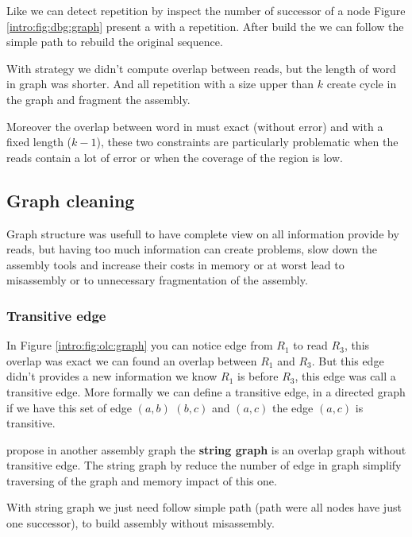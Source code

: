 \documentclass[./main.tex]{subfiles}
\begin{document}
Like \OLC we can detect repetition by inspect the number of successor of a node Figure \ref{intro:fig:dbg:graph} present a \DBG with a repetition. After build the \DBG we can follow the simple path to rebuild the original sequence.

With \DBG strategy we didn't compute overlap between reads, but the length of word in graph was shorter. And all repetition with a size upper than $k$ create cycle in the graph and fragment the assembly.

Moreover the overlap between word in \DBG must exact (without error) and with a fixed length ($k - 1$), these two constraints are particularly problematic when the reads contain a lot of error or when the coverage of the region is low.


\subsection{Graph cleaning}

Graph structure was usefull to have complete view on all information provide by reads, but having too much information can create problems, slow down the assembly tools and increase their costs in memory or at worst lead to misassembly or to unnecessary fragmentation of the assembly.

\subsubsection{Transitive edge}

In Figure \ref{intro:fig:olc:graph} you can notice edge from $R_1$ to read $R_3$, this overlap was exact we can found an overlap between $R_1$ and $R_3$. But this edge didn't provides a new information we know $R_1$ is before $R_3$, this edge was call a transitive edge. More formally we can define a transitive edge, in a directed graph if we have this set of edge $(a, b)$ $(b, c)$ and $(a, c)$ the edge $(a, c)$ is transitive.

\citeauthor{string_graph} propose in \cite{string_graph} another assembly graph the \textbf{string graph} is an overlap graph without transitive edge. The string graph by reduce the number of edge in graph simplify traversing of the graph and memory impact of this one.

With string graph we just need follow simple path (path were all nodes have just one successor), to build assembly without misassembly.
\end{document}
